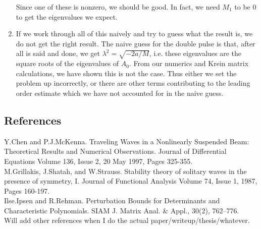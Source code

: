 \documentclass[12pt]{article}
\begin{document}
\begin{enumerate}
Since one of these is nonzero, we should be good. In fact, we need $M_1$ to be 0 to get the eigenvalues we expect.

\item If we work through all of this naively and try to guess what the result is, we do not get the right result. The naive guess for the double pulse is that, after all is said and done, we get $\lambda^2 = \sqrt{-2a / M}$, i.e. these eigenvalues are the square roots of the eigenvalues of $A_0$. From our numerics and Krein matrix calculations, we have shown this is not the case. Thus either we set the problem up incorrectly, or there are other terms contributing to the leading order estimate which we have not accounted for in the naive guess.


\end{enumerate}

\subsection{References}

Y.Chen and P.J.McKenna. Traveling Waves in a Nonlinearly Suspended Beam: Theoretical Results and Numerical Observations. Journal of Differential Equations Volume 136, Issue 2, 20 May 1997, Pages 325-355.\\

M.Grillakis, J.Shatah, and W.Strauss. Stability theory of solitary waves in the presence of symmetry, I. Journal of Functional Analysis Volume 74, Issue 1, 1987, Pages 160-197.\\

Ilse.Ipsen and R.Rehman. Perturbation Bounds for Determinants and Characteristic Polynomials. SIAM J. Matrix Anal. \& Appl., 30(2), 762–776.\\

Will add other references when I do the actual paper/writeup/thesis/whatever.
\end{document}

